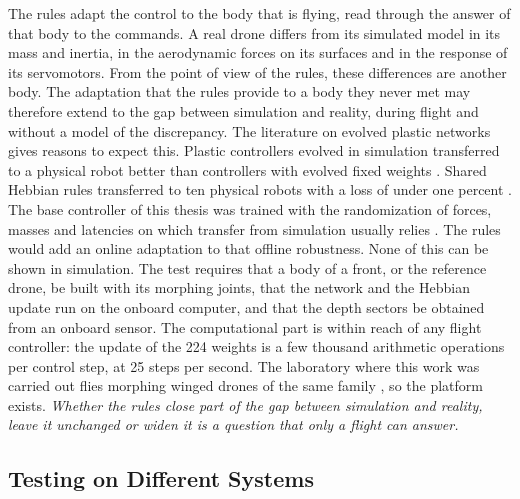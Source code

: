 The rules adapt the control to the body that is flying, read through the answer of that body to the commands. A real drone differs from its simulated model in its mass and inertia, in the aerodynamic forces on its surfaces and in the response of its servomotors. From the point of view of the rules, these differences are another body. The adaptation that the rules provide to a body they never met may therefore extend to the gap between simulation and reality, during flight and without a model of the discrepancy. The literature on evolved plastic networks gives reasons to expect this. Plastic controllers evolved in simulation transferred to a physical robot better than controllers with evolved fixed weights \cite{floreano2000evolutionary}. Shared Hebbian rules transferred to ten physical robots with a loss of under one percent \cite{vandiggelen2025emergent}. The base controller of this thesis was trained with the randomization of forces, masses and latencies on which transfer from simulation usually relies \cite{tobin2017domain, peng2018sim}. The rules would add an online adaptation to that offline robustness. None of this can be shown in simulation. The test requires that a body of a front, or the reference drone, be built with its morphing joints, that the network and the Hebbian update run on the onboard computer, and that the depth sectors be obtained from an onboard sensor. The computational part is within reach of any flight controller: the update of the 224 weights is a few thousand arithmetic operations per control step, at 25 steps per second. The laboratory where this work was carried out flies morphing winged drones of the same family \cite{bergonti2024codesign}, so the platform exists. \emph{Whether the rules close part of the gap between simulation and reality, leave it unchanged or widen it is a question that only a flight can answer.}

\subsection{Testing on Different Systems}
\label{subsec:future-other-systems}

